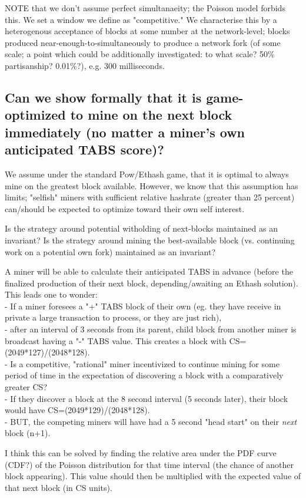 \documentclass[11pt]{article}
\theoremstyle{plain}
\begin{document}
{NOTE that we don't assume perfect simultanaeity; the Poisson model forbids this.
We set a window we define as "competitive." We characterise this by a
heterogenous acceptance of blocks at some number at the network-level; blocks
produced near-enough-to-simultaneously to produce a network fork (of some
scale; a point which could be additionally investigated: to what scale? 50\%
partisanship? 0.01\%?), e.g. 300 milliseconds.

\subsection{\small{Can we show formally that it is game-optimized to mine on
the next block immediately (no matter a miner's own anticipated TABS
score)?}}

We assume under the standard Pow/Ethash game, that it is optimal to always mine
on the greatest block available.
However, we know that this assumption has limits; "selfish" miners with
sufficient relative hashrate (greater than 25 percent) can/should be expected
to optimize toward their own self interest.

Is the strategy around potential witholding of next-blocks maintained as an
invariant?
Is the strategy around mining the best-available block (vs. continuing work on
a potential own fork) maintained as an invariant?

A miner will be able to calculate their anticipated TABS in advance (before the
finalized production of their next block, depending/awaiting an Ethash
solution).
This leads one to wonder: \\
- If a miner foresees a "+" TABS block of their own (eg. they have receive in
private a large transaction to process, or they are just rich), \\
- after an interval of 3 seconds from its parent, child block from another
miner is broadcast having a "-" TABS value. This creates a block with
CS=(2049*127)/(2048*128). \\
- Is a competitive, "rational" miner incentivized to continue mining for some
period of time in the expectation of discovering a block with a comparatively
greater CS? \\
    - If they discover a block at the 8 second interval (5 seconds later),
their block would have CS=(2049*129)/(2048*128). \\
    - BUT, the competing miners will have had a 5 second "head start" on their
\textit{next} block (n+1).

I think this can be solved by finding the relative area under the PDF curve
(CDF?) of the Poisson distribution for that time interval (the chance of
another block appearing).
This value should then be multiplied with the expected value of that next block
(in CS units).

}
\end{document}
